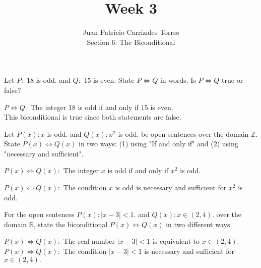 \documentclass[12pt]{article}
\newcommand{\Z}{\mathbb{Z}}
\newenvironment{problem}[2][Problem]{\begin{trivlist}
		\item[\hskip \labelsep {\bfseries #1}\hskip \labelsep {\bfseries #2.}]}{\end{trivlist}}
\newenvironment{solution}[2][Solution]{\begin{trivlist}
		\item[\hskip \labelsep {\bfseries #1}\hskip \labelsep {\bfseries #2.}]}{\end{trivlist}}
\begin{document}
	
\title{Week 3}
\author{Juan Patricio Carrizales Torres \\
Section 6: The Biconditional}

\maketitle

\begin{problem}{35}
	Let $P:$ 18 is odd. and $Q: $ 15 is even. State $P \Leftrightarrow Q$ in words. Is $P \Leftrightarrow Q$ true or false?
	\begin{solution}{}
		$P \Leftrightarrow Q:$ The integer 18 is odd if and only if 15 is even.\\
		This biconditional is true since both statements are false.
	\end{solution}
\end{problem}

\begin{problem}{36}
	Let $P(x): x$ is odd. and $Q(x): x^{2}$ is odd. be open sentences over the domain $\Z$. State $P(x) \Leftrightarrow Q(x)$ in two ways: (1) using "If and only if" and (2) using "necessary and sufficient".
	\begin{solution}{}
		$P(x) \Leftrightarrow Q(x): $ The integer $x$ is odd if and only if $x^{2}$ is odd.
		
		$P(x) \Leftrightarrow Q(x):$ The condition $x$ is odd is necessary and sufficient for $x^{2}$ is odd. 
	\end{solution}
\end{problem}

\begin{problem}{37}
	For the open sentences $P(x): \vert{x-3}\vert < 1.$ and $Q(x): x \in (2,4).$ over the domain $\mathbb{R}$, state the biconditional $P(x) \Leftrightarrow Q(x)$ in two different ways.
	\begin{solution}{}
		$P(x) \Leftrightarrow Q(x): $ The real number $\vert{x-3}\vert < 1$ is equivalent to $x \in (2,4)$.\\
		$P(x) \Leftrightarrow Q(x): $ The condition $\vert{x-3}\vert < 1$ is necessary and sufficient for $x \in (2,4).$
	\end{solution}
\end{problem}
\end{document}
